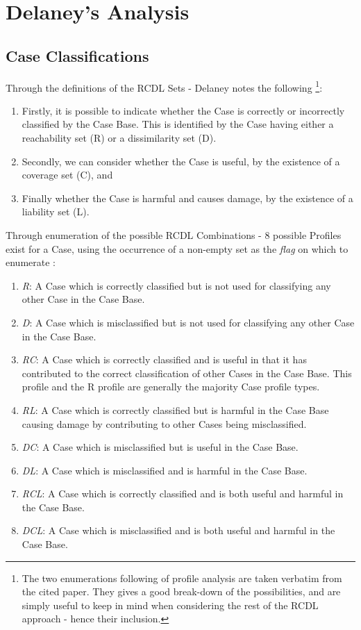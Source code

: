 \documentclass[a4paper,11pt]{report}
\begin{document}
\section{Delaney's Analysis}

\subsection{Case Classifications}
Through the definitions of the RCDL Sets - Delaney notes the following \citep{Delany2009}\footnote{The two enumerations following of profile analysis are taken verbatim from the cited paper. They gives a good break-down of the possibilities, and are simply useful to keep in mind when considering the rest of the RCDL approach - hence their inclusion.}:

\begin{enumerate}
	\item Firstly, it is possible to indicate whether the Case is correctly or incorrectly classified by the Case Base. This is identified by the Case having either a reachability set (R) or a dissimilarity set (D).
	\item Secondly, we can consider whether the Case is useful, by the existence of a coverage set (C), and
	\item Finally whether the Case is harmful and causes damage, by the existence of a liability set (L).
\end{enumerate}

Through enumeration of the possible RCDL Combinations - 8 possible Profiles exist for a Case, using the occurrence of a non-empty set as the \emph{flag} on which to enumerate \citep{Delany2009}:

\begin{enumerate}
	\item \emph{R}: A Case which is correctly classified but is not used for classifying any other Case in the Case Base.
	\item \emph{D}: A Case which is misclassified but is not used for classifying any other Case in the Case Base.
	\item \emph{RC}: A Case which is correctly classified and is useful in that it has contributed to the correct classification of other Cases in the Case Base. This profile and the R profile are generally the majority Case profile types.
	\item \emph{RL}: A Case which is correctly classified but is harmful in the Case Base causing damage by contributing to other Cases being misclassified.
	\item \emph{DC}: A Case which is misclassified but is useful in the Case Base. 
	\item \emph{DL}: A Case which is misclassified and is harmful in the Case Base.
	\item \emph{RCL}: A Case which is correctly classified and is both useful and harmful in the Case Base.
	\item \emph{DCL}: A Case which is misclassified and is both useful and harmful in the Case Base.
\end{enumerate}
\end{document}
